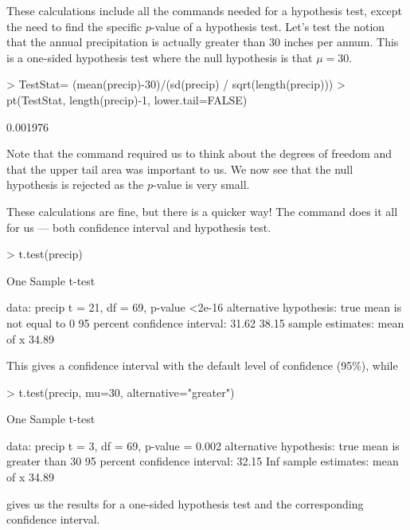 These calculations include all the commands needed for a hypothesis test, except the need to find the specific $p$-value of a hypothesis test. Let's test the notion that the annual precipitation is actually greater than 30 inches per annum. This is a one-sided hypothesis test where the null hypothesis is that $\mu=30$. 
\begin{Schunk}
\begin{Sinput}
> TestStat= (mean(precip)-30)/(sd(precip) / sqrt(length(precip))) 
> pt(TestStat, length(precip)-1, lower.tail=FALSE) 
\end{Sinput}
\begin{Soutput}
[1] 0.001976
\end{Soutput}
\end{Schunk}
 Note that the  command required us to think about the degrees of freedom and that the upper tail area was important to us. We now see that the null hypothesis is rejected as the $p$-value is very small. 
 
These calculations are fine, but there is a quicker way! The  command does it all for us --- both confidence interval and hypothesis test. 
\begin{Schunk}
\begin{Sinput}
> t.test(precip) 
\end{Sinput}
\begin{Soutput}

	One Sample t-test

data:  precip
t = 21, df = 69, p-value <2e-16
alternative hypothesis: true mean is not equal to 0
95 percent confidence interval:
 31.62 38.15
sample estimates:
mean of x 
    34.89 
\end{Soutput}
\end{Schunk}
This gives a confidence interval with the default level of confidence (95\%), while 
\begin{Schunk}
\begin{Sinput}
> t.test(precip, mu=30, alternative="greater") 
\end{Sinput}
\begin{Soutput}

	One Sample t-test

data:  precip
t = 3, df = 69, p-value = 0.002
alternative hypothesis: true mean is greater than 30
95 percent confidence interval:
 32.15   Inf
sample estimates:
mean of x 
    34.89 
\end{Soutput}
\end{Schunk}
gives us the results for a one-sided hypothesis test and the corresponding confidence interval. 
 
